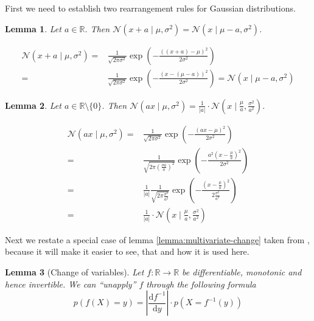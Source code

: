 \documentclass[11pt,a4paper]{book}
\newtheorem{lemma}{Lemma}
\begin{document}
First we need to establish two rearrangement rules for Gaussian distributions.
\begin{lemma}
  \label{lemma:x-mu-symmetry}
  Let $a \in \mathbb{R}$. Then
  $\mathcal{N}(x + a \mid \mu, \sigma^{2}) = \mathcal{N}(x \mid \mu - a,
  \sigma^{2})$.
\end{lemma}
\begin{proof2}
  \begin{align*}
    \mathcal{N}(x + a \mid \mu, \sigma^{2}) = & \frac{1}{\sqrt{2 \pi \sigma^{2}}} \exp\left( - \frac{\left((x + a) - \mu \right)^{2}}{2\sigma^{2}} \right)\\
    = & \frac{1}{\sqrt{2 \pi \sigma^{2}}} \exp\left( - \frac{\left(x - (\mu - a) \right)^{2}}{2\sigma^{2}} \right) = \mathcal{N}(x \mid \mu - a, \sigma^{2})
  \end{align*}
\end{proof2}

\begin{lemma}
  \label{lemma:gaussian-parameter-scaling}
  Let $a \in \mathbb{R} \setminus \{ 0 \}$. Then
  $\mathcal{N}(ax \mid \mu, \sigma^{2}) = \frac{1}{|a|} \cdot \mathcal{N}\left(x \mid
  \frac{\mu}{a}, \frac{\sigma^{2}}{a^{2}}\right)$.
\end{lemma}
\begin{proof2}
  \begin{align*}
    \mathcal{N}(ax \mid \mu, \sigma^{2}) = & \frac{1}{\sqrt{2 \pi \sigma^{2}}} \exp\left( -\frac{\left(ax - \mu \right)^{2}}{2\sigma^{2}} \right)\\
    = & \frac{1}{\sqrt{2 \pi \left( \frac{\sigma a}{a} \right)^{2}}} \exp\left( -\frac{a^{2}\left(x - \frac{\mu}{a} \right)^{2}}{2\sigma^{2}} \right)\\
    = & \frac{1}{|a|} \frac{1}{\sqrt{2 \pi \frac{\sigma^{2}}{a^{2}}}} \exp\left( -\frac{\left(x - \frac{\mu}{a} \right)^{2}}{2 \frac{\sigma^{2}}{a^{2}}} \right)\\
    = & \frac{1}{|a|} \cdot \mathcal{N}\left( x \mid \frac{\mu}{a}, \frac{\sigma^{2}}{a^{2}} \right)
  \end{align*}
\end{proof2}

Next we restate a special case of lemma \ref{lemma:multivariate-change} taken
from \cite[chapter~2.6.2]{murphy}, because it will make it easier to see, that
and how it is used here.
\begin{lemma}[Change of variables]
  \label{lemma:change}
  Let $f : \mathbb{R} \rightarrow \mathbb{R}$ be differentiable, monotonic and
  hence invertible. We can ``unapply'' $f$ through the following formula
  \begin{equation*}
    p(f(X) = y) = \left| \frac{\mathrm{d}f^{-1}}{\mathrm{d}y} \right| \cdot p(X = f^{-1}(y))
  \end{equation*}
\end{lemma}
\end{document}
